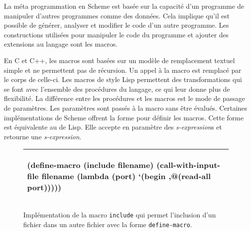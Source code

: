 


La méta programmation en Scheme est basée sur la capacité d'un programme de
manipuler d'autres programmes comme des données. Cela implique qu'il est
possible de générer, analyser et modifier le code d'un autre programme.  Les
constructions utilisées pour manipuler le code du programme et ajouter des
extensions au langage sont les macros.

En C et C++, les macros sont basées sur un modèle de remplacement textuel
simple et ne permettent pas de récursion.  Un appel à la macro est remplacé par
le corps de celle-ci. Les macros de style Lisp permettent des transformations
qui se font avec l'ensemble des procédures du langage, ce qui leur donne plus
de flexibilité.  La différence entre les procédures et les macros est le mode
de passage de paramètres.  Les paramètres sont passés à la macro sans être
évalués.  Certaines implémentations de Scheme offrent la forme
 pour définir les macros.  Cette forme est équivalente au
 de Lisp. Elle accepte en paramètre des
\textit{s-expression}s et retourne une \textit{s-expression}.

\begin{figure}[htbp]
  \begin{tabular}{|l|}\hline
\begin{mplisting}{0.7}
(define-macro (include filename)
  (call-with-input-file
    filename
    (lambda (port)
      `(begin
        ,@(read-all port)))))
\end{mplisting}\\\hline
\end{tabular}

  \caption{Implémentation de la macro \texttt{include} qui permet l'inclusion
  d'un fichier dans un autre fichier avec la forme \texttt{define-macro}.}

  \label{fig:macro_include}
\end{figure}

